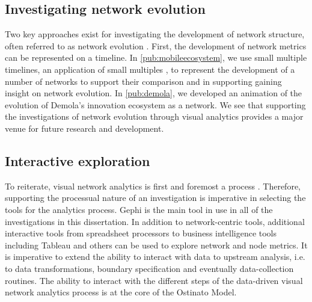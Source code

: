 

\subsection{Investigating network evolution}

Two key approaches exist for investigating the development of network structure, often referred to as network evolution \citep[cf.][]{Ahuja2012TheNetworks}. First, the development of network metrics can be represented on a timeline. In \ref{pub:mobileecosystem}, we use small multiple timelines, an application of small multiples \citep{Heer2012InteractiveAnalysis,Tufte1983VisualInformation}, to represent the development of a number of networks to support their comparison and in supporting gaining insight on network evolution. In \ref{pub:demola}, we developed an animation of the evolution of Demola's innovation ecosystem as a network. We see that supporting the investigations of network evolution through visual analytics provides a major venue for future research and development.



\subsection{Interactive exploration}

To reiterate, visual network analytics is first and foremost a process \citep{Heer2012InteractiveAnalysis, Keim2010MasteringAnalytics}. Therefore, supporting the processual nature of an investigation is imperative in selecting the tools for the analytics process. Gephi is the main tool in use in all of the investigations in this dissertation. In addition to network-centric tools, additional interactive tools from spreadsheet processors to business intelligence tools including Tableau and others can be used to explore network and node metrics. It is imperative to extend the ability to interact with data to upstream analysis, i.e. to data transformations, boundary specification and eventually data-collection routines. The ability to interact with the different steps of the data-driven visual network analytics process is at the core of the Ostinato Model.

